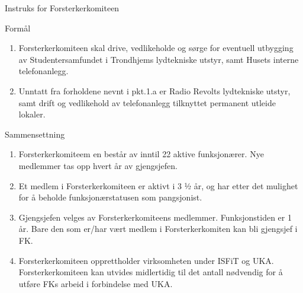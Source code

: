 
\begin{instruks}{Instruks for Forsterkerkomiteen}{}{}

    \begin{instruksledd}{Formål}
        \begin{enumerate}
            \item Forsterkerkomiteen skal drive, vedlikeholde og sørge for eventuell utbygging av
            Studentersamfundet i
            Trondhjems lydtekniske utstyr, samt Husets interne telefonanlegg.
            \item Unntatt fra forholdene nevnt i pkt.1.a er Radio Revolts lydtekniske utstyr, samt drift
            og vedlikehold av telefonanlegg tilknyttet permanent utleide lokaler.
        \end{enumerate}
    \end{instruksledd}

    \begin{instruksledd}{Sammensettning}
        \begin{enumerate}
            \item Forsterkerkomiteem en består av inntil 22 aktive funksjonærer. Nye medlemmer tas opp
                hvert år av gjengsjefen.
            \item Et medlem i Forsterkerkomiteen er aktivt i 3 ½ år, og har etter det mulighet for å
                beholde funksjonærstatusen som pangsjonist.
            \item Gjengsjefen velges av Forsterkerkomiteens medlemmer. Funksjonstiden er 1 år. Bare den
                som er/har vært medlem i Forsterkerkomiten kan bli gjengsjef i FK.
            \item Forsterkerkomiteen opprettholder virksomheten under ISFiT og UKA.
                Forsterkerkomiteen kan utvides midlertidig til det antall nødvendig for å utføre FKs arbeid i forbindelse med UKA.
        \end{enumerate}
    \end{instruksledd}


\end{instruks}
